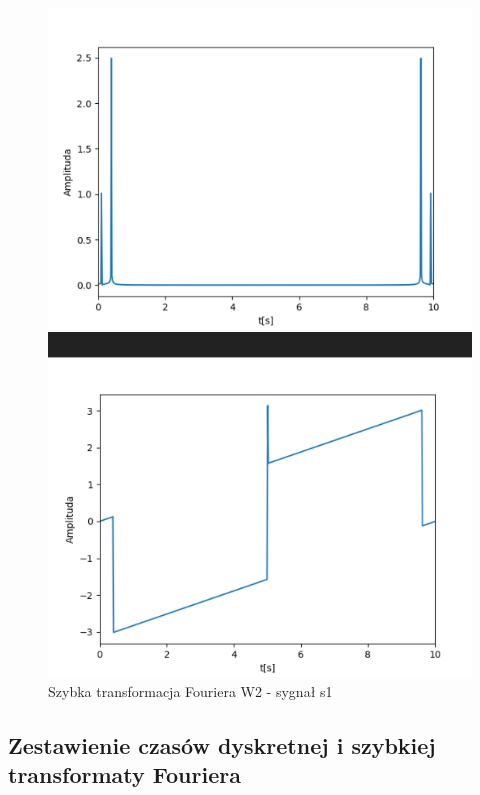 \documentclass[12pt]{article}
\begin{document}
\begin{figure}[H]
\centering
\includegraphics[scale=0.6]{s1FastW2.png}
\caption{Szybka transformacja Fouriera W2 - sygnał s1}
\end{figure}


\subsection{Zestawienie czasów dyskretnej i szybkiej transformaty Fouriera}
\end{document}
